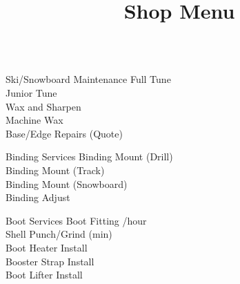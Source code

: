 \documentclass{beamer}
\title{Shop Menu}
\begin{document}
  \begin{frame}[fragile]\centering
    \begin{columns}[T]
        \begin{column}{.90\textwidth}
            \begin{block}{Ski/Snowboard Maintenance}
                Full Tune \hfill {}\\
                Junior Tune \hfill {}\\
                Wax and Sharpen \hfill {}\\
                Machine Wax \hfill{}\\
                Base/Edge Repairs \hfill(Quote)
            \end{block}
             \begin{block}{Binding Services}
                Binding Mount (Drill) \hfill {}\\
                Binding Mount (Track) \hfill {}\\
                Binding Mount (Snowboard)\hfill {}\\
                Binding Adjust \hfill {}
            \end{block}
            \begin{block}{Boot Services}
                Boot Fitting \hfill {}/hour\\
                Shell Punch/Grind \hfill {} (min)\\
                Boot Heater Install \hfill {}\\
                Booster Strap Install \hfill {}\\
                Boot Lifter Install \hfill {}
            \end{block}
        \end{column}
    \end{columns}
  \end{frame}
\end{document}

